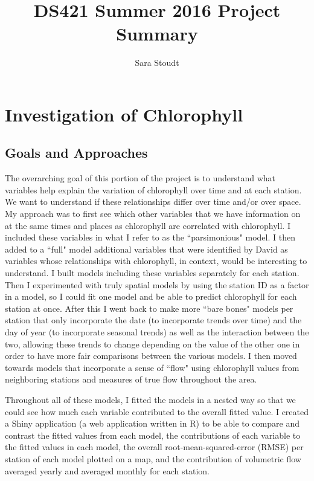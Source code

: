 \documentclass[12pt]{amsart}
\title{DS421 Summer 2016 Project Summary}
\author{Sara Stoudt}
\begin{document}
\maketitle

\section{Investigation of Chlorophyll}

\subsection{Goals and Approaches}
The overarching goal of this portion of the project is to understand what variables help explain the variation of chlorophyll over time and at each station. We want to understand if these relationships differ over time and/or over space. My approach was to first see which other variables that we have information on at the same times and places as chlorophyll are correlated with chlorophyll. I included these variables in what I refer to as the ``parsimonious" model. I then added to a ``full" model additional variables that were identified by David as variables whose relationships with chlorophyll, in context, would be interesting to understand. I built models including these variables separately for each station. Then I experimented with truly spatial models by using the station ID as a factor in a model, so I could fit one model and be able to predict chlorophyll for each station at once. After this I went back to make more ``bare bones" models per station that only incorporate the date (to incorporate trends over time) and the day of year (to incorporate seasonal trends) as well as the interaction between the two, allowing these trends to change depending on the value of the other one in order to have more fair comparisons between the various models. I then moved towards models that incorporate a sense of ``flow" using chlorophyll values from neighboring stations and measures of true flow throughout the area. 

Throughout all of these models, I fitted the models in a nested way so that we could see how much each variable contributed to the overall fitted value. I created a Shiny application (a web application written in R) to be able to compare and contrast the fitted values from each model, the contributions of each variable to the fitted values in each model, the overall root-mean-squared-error (RMSE) per station of each model plotted on a map, and the contribution of volumetric flow averaged yearly and averaged monthly for each station.
\end{document}
